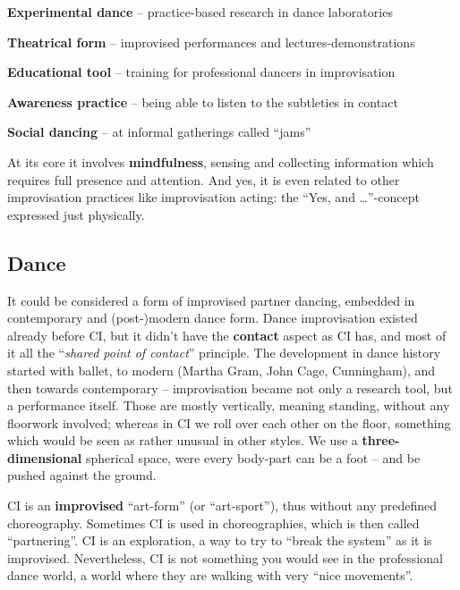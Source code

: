 \begin{itemize*}
	\item [] \textbf{Experimental dance} -- practice-based research in dance laboratories
	\item [] \textbf{Theatrical form} -- improvised performances and lectures-demonstrations
	\item [] \textbf{Educational tool} -- training for professional dancers in improvisation
	\item [] \textbf{Awareness practice} -- being able to listen to the subtleties in contact
	\item [] \textbf{Social dancing} -- at informal gatherings called ``jams''
\end{itemize*}

At its core it involves \textbf{mindfulness}, sensing and collecting information which requires full presence and attention.
And yes, it is even related to other improvisation practices like improvisation acting: the ``Yes, and \ldots''-concept expressed just physically.

\subsection{Dance}\label{subsec:dance}

It could be considered a form of improvised partner dancing, embedded in contemporary and (post-)modern dance form.
Dance improvisation existed already before CI, but it didn't have the \textbf{contact} aspect as CI has, and most of it all the ``\textit{shared point of contact}'' principle.
The development in dance history started with ballet, to modern (Martha Gram, John Cage, Cunningham), and then towards contemporary -- improvisation became not only a research tool, but a performance itself.
Those are mostly vertically, meaning standing, without any floorwork involved; whereas in CI we roll over each other on the floor, something which would be seen as rather unusual in other styles.
We use a \textbf{three-dimensional} spherical space, were every body-part can be a foot -- and be pushed against the ground.

CI is an \textbf{improvised} ``art-form'' (or ``art-sport''), thus without any predefined choreography.
Sometimes CI is used in choreographies, which is then called ``partnering''.
CI is an exploration, a way to try to ``break the system'' as it is improvised.
Nevertheless, CI is not something you would see in the professional dance world, a world where they are walking with very ``nice movements''.

